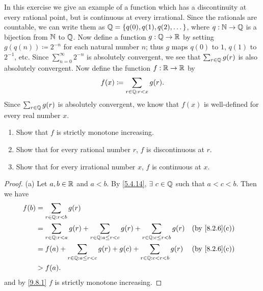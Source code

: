 \begin{ex}\label{ex:9.8.5}
  In this exercise we give an example of a function which has a discontinuity at every rational point, but is continuous at every irrational.
  Since the rationals are countable, we can write them as \(\mathbb{Q} = \{q(0), q(1), q(2), \dots\}\), where \(q : \mathbb{N} \to \mathbb{Q}\) is a bijection from \(\mathbb{N}\) to \(\mathbb{Q}\).
  Now define a function \(g : \mathbb{Q} \to \mathbb{R}\) by setting \(g(q(n)) \coloneqq 2^{-n}\) for each natural number \(n\);
  thus \(g\) maps \(q(0)\) to \(1\), \(q(1)\) to \(2^{-1}\), etc.
  Since \(\sum_{n = 0}^\infty 2^{-n}\) is absolutely convergent, we see that \(\sum_{r \in \mathbb{Q}} g(r)\) is also absolutely convergent.
  Now define the function \(f : \mathbb{R} \to \mathbb{R}\) by
  \[
    f(x) \coloneqq \sum_{r \in \mathbb{Q} : r < x} g(r).
  \]
  Since \(\sum_{r \in \mathbb{Q}} g(r)\) is absolutely convergent, we know that \(f(x)\) is well-defined for every real number \(x\).
  \begin{enumerate}
    \item Show that \(f\) is strictly monotone increasing.
    \item Show that for every rational number \(r\), \(f\) is discontinuous at \(r\).
    \item Show that for every irrational number \(x\), \(f\) is continuous at \(x\).
  \end{enumerate}
\end{ex}

\begin{proof}{(a)}
  Let \(a, b \in \mathbb{R}\) and \(a < b\).
  By \cref{5.4.14}, \(\exists\ c \in \mathbb{Q}\) such that \(a < c < b\).
  Then we have
  \begin{align*}
    f(b) & = \sum_{r \in \Q : r < b} g(r)                                                                                                              \\
         & = \sum_{r \in \Q : r < a} g(r) + \sum_{r \in \Q : a \leq r < c} g(r) + \sum_{r \in \Q : c \leq r < b} g(r) &  & \text{(by \cref{8.2.6}(c))} \\
         & = f(a) + \sum_{r \in \Q : a \leq r < c} g(r) + g(c) + \sum_{r \in \Q : c < r < b} g(r)                     &  & \text{(by \cref{8.2.6}(c))} \\
         & > f(a).
  \end{align*}
  and by \cref{9.8.1} \(f\) is strictly monotone increasing.
\end{proof}

